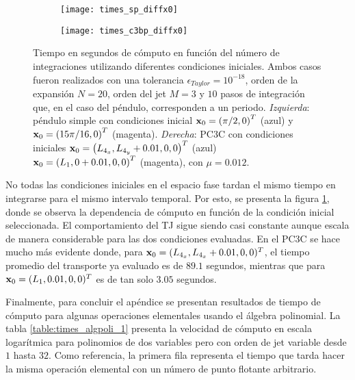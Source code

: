 \begin{figure}[h!]
\centering
\begin{subfigure}{0.49\textwidth}
	\centering
	\texttt{[image: times\_sp\_diffx0]}
\end{subfigure}
%
\begin{subfigure}{0.49\textwidth}
	\centering
	\texttt{[image: times\_c3bp\_diffx0]}
\end{subfigure}
\caption{Tiempo en segundos de cómputo en función del número de integraciones utilizando diferentes condiciones iniciales. Ambos casos fueron realizados con una tolerancia $\epsilon_{Taylor} = 10^{-18}$, orden de la expansión $N=20$, orden del jet $M=3$ y $10$ pasos de integración que, en el caso del péndulo, corresponden a un periodo. \textit{Izquierda}: péndulo simple con condiciones inicial $\mathbf{x}_0 = \left(\pi/2, 0 \right)^T$ (azul) y $\mathbf{x}_0 = \left(15\pi/16, 0 \right)^T$ (magenta). \textit{Derecha}: PC3C con condiciones iniciales $\mathbf{x}_0 = \left(L_{4_x}, L_{4_y} + 0.01, 0, 0 \right)^T$ (azul) $\mathbf{x}_0 = \left(L_{1}, 0 + 0.01, 0, 0 \right)^T$ (magenta), con $\mu = 0.012$.}
\label{fig:times_diffx0}
\end{figure}

No todas las condiciones iniciales en el espacio fase tardan el mismo tiempo en integrarse para el mismo intervalo temporal. Por esto, se presenta la figura \ref{fig:times_diffx0}, donde se observa la dependencia de cómputo en función de la condición inicial seleccionada. El comportamiento del TJ sigue siendo casi constante aunque escala de manera considerable para las dos condiciones evaluadas. En el PC3C se hace mucho más evidente donde, para $\mathbf{x}_0 = (L_{4_x}, L_{4_x} + 0.01, 0, 0)^T$, el tiempo promedio del transporte ya evaluado es de $89.1$ segundos, mientras que para $\mathbf{x}_0 = (L_1, 0.01, 0, 0)^T$ es de tan solo $3.05$ segundos.

Finalmente, para concluir el apéndice se presentan resultados de tiempo de cómputo para algunas operaciones elementales usando el álgebra polinomial. La tabla \ref{table:times_algpoli_1} presenta la velocidad de cómputo en escala logarítmica para polinomios de dos variables pero con orden de jet variable desde $1$ hasta $32$. Como referencia, la primera fila representa el tiempo que tarda hacer la misma operación elemental con un número de punto flotante arbitrario. 

